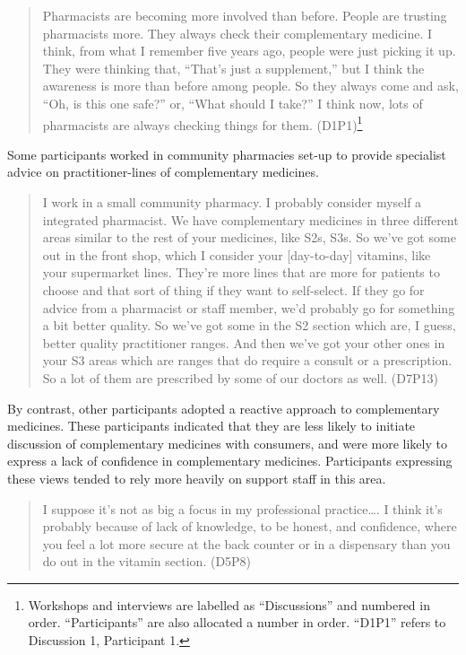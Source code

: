 \documentclass[11pt,a4paper]{article}
\begin{document}
\begin{quote}
Pharmacists are becoming more involved than before. People are trusting
pharmacists more. They always check their complementary medicine. I
think, from what I remember five years ago, people were just picking it
up. They were thinking that, ``That's just a supplement,'' but I think
the awareness is more than before among people. So they always come and
ask, ``Oh, is this one safe?'' or, ``What should I take?'' I think now,
lots of pharmacists are always checking things for them.
(D1P1)\footnote{Workshops and interviews are labelled as ``Discussions''
  and numbered in order. ``Participants'' are also allocated a number in
  order. ``D1P1'' refers to Discussion 1, Participant 1.}
\end{quote}

Some participants worked in community pharmacies set-up to provide
specialist advice on practitioner-lines of complementary medicines.

\begin{quote}
I work in a small community pharmacy. I probably consider myself a
integrated pharmacist. We have complementary medicines in three
different areas similar to the rest of your medicines, like S2s, S3s. So
we've got some out in the front shop, which I consider your
{[}day-to-day{]} vitamins, like your supermarket lines. They're more
lines that are more for patients to choose and that sort of thing if
they want to self-select. If they go for advice from a pharmacist or
staff member, we'd probably go for something a bit better quality. So
we've got some in the S2 section which are, I guess, better quality
practitioner ranges. And then we've got your other ones in your S3 areas
which are ranges that do require a consult or a prescription. So a lot
of them are prescribed by some of our doctors as well. (D7P13)
\end{quote}

By contrast, other participants adopted a reactive approach to
complementary medicines. These participants indicated that they are less
likely to initiate discussion of complementary medicines with consumers,
and were more likely to express a lack of confidence in complementary
medicines. Participants expressing these views tended to rely more
heavily on support staff in this area.

\begin{quote}
I suppose it's not as big a focus in my professional practice\ldots{}. I
think it's probably because of lack of knowledge, to be honest, and
confidence, where you feel a lot more secure at the back counter or in a
dispensary than you do out in the vitamin section. (D5P8)
\end{quote}
\end{document}
